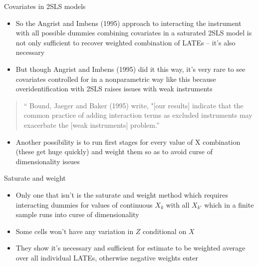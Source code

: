 \documentclass{beamer}
\begin{document}
\begin{frame}{Covariates in 2SLS models}

\begin{itemize}
\item So the Angrist and Imbens (1995) approach to interacting the instrument with all possible dummies combining covariates in a saturated 2SLS model is not only sufficient to recover weighted combination of LATEs -- it's also necessary
\item But though Angrist and Imbens (1995) did it this way, it's very rare to see covariates controlled for in a nonparametric way like this because overidentification with 2SLS raises issues with weak instruments
\end{itemize}

\begin{quote}
`` Bound, Jaeger and Baker (1995) write, "[our results] indicate that the common practice of adding interaction terms as excluded instruments may exacerbate the [weak instruments] problem.''
\end{quote}
\begin{itemize}
\item Another possibility is to run first stages for every value of X combination (these get huge quickly) and weight them so as to avoid curse of dimensionality issues
\end{itemize}

\end{frame}



\begin{frame}{Saturate and weight}

\begin{itemize}
\item Only one that isn't is the saturate and weight method which requires interacting dummies for values of continuous $X_k$ with all $X_{k'}$ which in a finite sample runs into curse of dimensionality
\item Some cells won't have any variation in $Z$ conditional on $X$
\item They show it's necessary and sufficient for estimate to be weighted average over all individual LATEs, otherwise negative weights enter
\end{itemize}

\end{frame}
\end{document}
